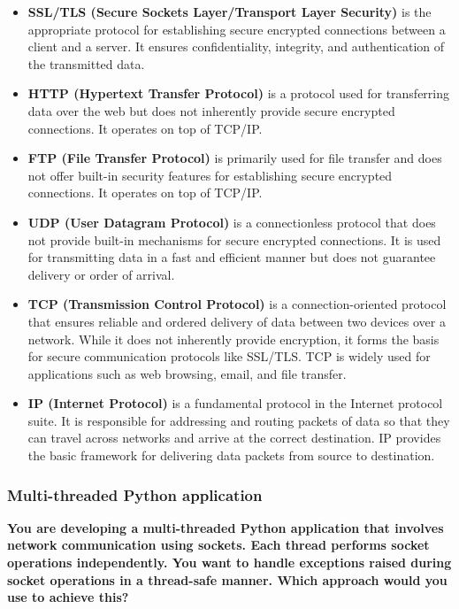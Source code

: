 \begin{itemize}
    \item \textbf{SSL/TLS (Secure Sockets Layer/Transport Layer Security)} is the appropriate protocol for establishing secure encrypted connections between a client and a server. It ensures confidentiality, integrity, and authentication of the transmitted data.
    
    \item \textbf{HTTP (Hypertext Transfer Protocol)} is a protocol used for transferring data over the web but does not inherently provide secure encrypted connections. It operates on top of TCP/IP.
    
    \item \textbf{FTP (File Transfer Protocol)} is primarily used for file transfer and does not offer built-in security features for establishing secure encrypted connections. It operates on top of TCP/IP.
    
    \item \textbf{UDP (User Datagram Protocol)} is a connectionless protocol that does not provide built-in mechanisms for secure encrypted connections. It is used for transmitting data in a fast and efficient manner but does not guarantee delivery or order of arrival.
    
    \item \textbf{TCP (Transmission Control Protocol)} is a connection-oriented protocol that ensures reliable and ordered delivery of data between two devices over a network. While it does not inherently provide encryption, it forms the basis for secure communication protocols like SSL/TLS. TCP is widely used for applications such as web browsing, email, and file transfer.
    
    \item \textbf{IP (Internet Protocol)} is a fundamental protocol in the Internet protocol suite. It is responsible for addressing and routing packets of data so that they can travel across networks and arrive at the correct destination. IP provides the basic framework for delivering data packets from source to destination.
\end{itemize}

\newpage
\subsubsection{Multi-threaded Python application}
\textbf{You are developing a multi-threaded Python application that involves network communication using sockets. Each thread performs socket operations independently. You want to handle exceptions raised during socket operations in a thread-safe manner. Which approach would you use to achieve this?}\\

